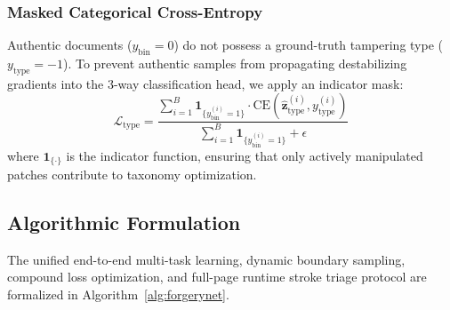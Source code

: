 \documentclass[pdflatex,sn-mathphys-num,iicol]{sn-jnl}
\begin{document}
\subsubsection{Masked Categorical Cross-Entropy}
Authentic documents ($y_{\text{bin}} = 0$) do not possess a ground-truth tampering type ($y_{\text{type}} = -1$). To prevent authentic samples from propagating destabilizing gradients into the 3-way classification head, we apply an indicator mask:
\begin{equation}
\mathcal{L}_{\text{type}} = \frac{\sum_{i=1}^B \mathbf{1}_{\{y_{\text{bin}}^{(i)} = 1\}} \cdot \text{CE}(\hat{\mathbf{z}}_{\text{type}}^{(i)}, y_{\text{type}}^{(i)})}{\sum_{i=1}^B \mathbf{1}_{\{y_{\text{bin}}^{(i)} = 1\}} + \epsilon}\label{eq_loss_type}
\end{equation}
where $\mathbf{1}_{\{\cdot\}}$ is the indicator function, ensuring that only actively manipulated patches contribute to taxonomy optimization.

\subsection{Algorithmic Formulation}\label{subsec4_6}
The unified end-to-end multi-task learning, dynamic boundary sampling, compound loss optimization, and full-page runtime stroke triage protocol are formalized in Algorithm~\ref{alg:forgerynet}.
\end{document}
